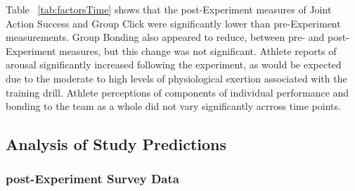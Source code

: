\documentclass[english]{article}\usepackage[]{graphicx}\usepackage[]{color}
\makeatletter
\newenvironment{kframe}{%
 \def\at@end@of@kframe{}%
 \ifinner\ifhmode%
  \def\at@end@of@kframe{\end{minipage}}%
  \begin{minipage}{\columnwidth}%
 \fi\fi%
 \def\FrameCommand##1{\hskip\@totalleftmargin \hskip-\fboxsep
 \colorbox{shadecolor}{##1}\hskip-\fboxsep
     \hskip-\linewidth \hskip-\@totalleftmargin \hskip\columnwidth}%
 \MakeFramed {\advance\hsize-\width
   \@totalleftmargin\z@ \linewidth\hsize
   \@setminipage}}%
 {\par\unskip\endMakeFramed%
 \at@end@of@kframe}
\newenvironment{knitrout}{}{} %
\makeatother
\begin{document}
\begin{knitrout}
\begin{kframe}
{\ttfamily\noindent\color{warningcolor}{\#\# Warning in StdDiff(variable = var, group = strataVar): Variable has only NA's in at least one stratum. na.rm turned off.}}

{\ttfamily\noindent\color{warningcolor}{\#\# Warning in StdDiff(variable = var, group = strataVar): Variable has only NA's in at least one stratum. na.rm turned off.}}

{\ttfamily\noindent\color{warningcolor}{\#\# Warning in StdDiff(variable = var, group = strataVar): Variable has only NA's in at least one stratum. na.rm turned off.}}\end{kframe}
\end{knitrout}



Table ~\ref{tab:factorsTime} shows that the post-Experiment measures of Joint Action Success and Group Click were significantly lower than pre-Experiment measurements.  Group Bonding also appeared to reduce, between pre- and post-Experiment measures,  but this change was not significant.  Athlete reports of arousal significantly increased following the experiment, as would be expected due to the moderate to high levels of physiological exertion associated with the training drill.  Athlete perceptions of components of individual performance and bonding to the team as a whole did not vary significantly acrross time points.














\subsection{Analysis of Study Predictions}



\subsubsection{post-Experiment Survey Data}
\end{document}
